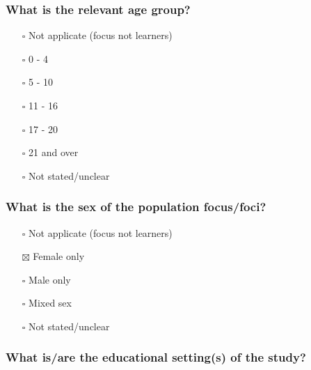 \documentclass[
  doc, a4paper]{apa7}
\providecommand{\tightlist}{%
  \setlength{\itemsep}{0pt}\setlength{\parskip}{0pt}}
\begin{document}
\subsubsection{What is the relevant age group?}\label{what-is-the-relevant-age-group}

\begin{itemize}
\tightlist
\item[$\square$]
  Not applicate (focus not learners)\\
\item[$\square$]
  0 - 4\\
\item[$\square$]
  5 - 10\\
\item[$\square$]
  11 - 16\\
\item[$\square$]
  17 - 20\\
\item[$\square$]
  21 and over\\
\item[$\square$]
  Not stated/unclear
\end{itemize}

\subsubsection{What is the sex of the population focus/foci?}\label{what-is-the-sex-of-the-population-focusfoci}

\begin{itemize}
\tightlist
\item[$\square$]
  Not applicate (focus not learners)\\
\item[$\boxtimes$]
  Female only\\
\item[$\square$]
  Male only\\
\item[$\square$]
  Mixed sex\\
\item[$\square$]
  Not stated/unclear
\end{itemize}

\subsubsection{What is/are the educational setting(s) of the study?}\label{what-isare-the-educational-settings-of-the-study}
\end{document}
